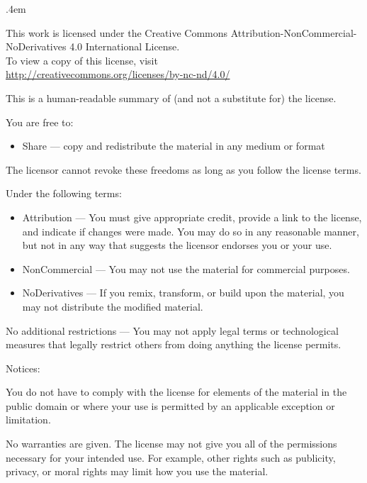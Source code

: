 {\small\parindent 0pt \parskip .4em\raggedright\thispagestyle{empty}

{\center
{\LARGE\ccbyncnd}

This work is licensed under the Creative Commons
Attribution-NonCommercial-NoDerivatives 4.0 International License.\\
To view a copy of this license, visit\\
\href{http://creativecommons.org/licenses/by-nc-nd/4.0}
{http://creativecommons.org/licenses/by-nc-nd/4.0/}

}

\vspace{.4em}
This is a human-readable summary of (and not a substitute for) the
license.

You are free to:

\begin{itemize}

\item Share — copy and redistribute the material in any medium or format

\end{itemize}

The licensor cannot revoke these freedoms as long as you follow the
license terms.

Under the following terms:

\begin{itemize}

\item Attribution — You must give appropriate credit, provide a link to the
license, and indicate if changes were made. You may do so in any
reasonable manner, but not in any way that suggests the licensor
endorses you or your use.

\item NonCommercial — You may not use the material for commercial purposes.

\item NoDerivatives — If you remix, transform, or build upon the material, you
may not distribute the modified material.

\end{itemize}

No additional restrictions — You may not apply legal terms or
technological measures that legally restrict others from doing anything
the license permits.

Notices:

You do not have to comply with the license for elements of the material
in the public domain or where your use is permitted by an applicable
exception or limitation.

No warranties are given. The license may not give you all of the
permissions necessary for your intended use. For example, other rights
such as publicity, privacy, or moral rights may limit how you use the
material.

}
